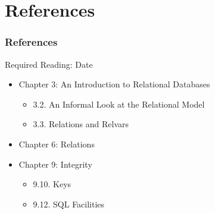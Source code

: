 \documentclass[dvipsnames]{beamer}
\theoremstyle{plain}
\begin{document}
\section*{References}

\begin{frame}
  \frametitle{References}

  \begin{block}{Required Reading: Date}
    \begin{itemize}
      \item Chapter 3: An Introduction to Relational Databases
      \begin{itemize}
        \item 3.2. \alert{An Informal Look at the Relational Model}
        \item 3.3. \alert{Relations and Relvars}
      \end{itemize}

      \item Chapter 6: \alert{Relations}

      \item Chapter 9: Integrity
      \begin{itemize}
        \item 9.10. \alert{Keys}
        \item 9.12. \alert{SQL Facilities}
      \end{itemize}
    \end{itemize}
  \end{block}
\end{frame}
\end{document}
